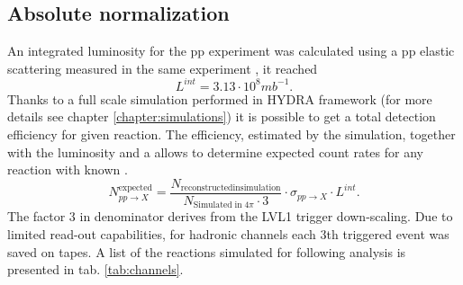 \subsection{Absolute normalization}
\label{sec:normalization}
An integrated luminosity for the pp experiment was calculated using a pp elastic scattering measured in the same experiment \cite{hades_normalization}, it reached
\begin{equation}
  L^{int}=3.13 \cdot 10^8 mb^{-1}.
\end{equation}
Thanks to a full scale simulation performed in HYDRA framework (for more details see chapter \ref{chapter:simulations}) it is possible to get a total detection efficiency for given reaction. The efficiency, estimated by the simulation, together with the luminosity and a \cs allows to determine expected count rates for any reaction with known \cs.
\begin{equation}
  N^{\mathrm{expected}}_{pp\rightarrow X}=\frac{N_{\mathrm{reconstructed in simulation}}}{N_{\mathrm{Simulated \; in \;} 4 \pi} \cdot 3} \cdot \sigma_{pp\rightarrow X} \cdot L^{int}.
\end{equation}
The factor 3 in denominator derives from the LVL1 trigger down-scaling. Due to limited read-out capabilities, for hadronic channels each 3th triggered event was saved on tapes. A list of the reactions simulated for following analysis is presented in tab. \ref{tab:channels}.  
